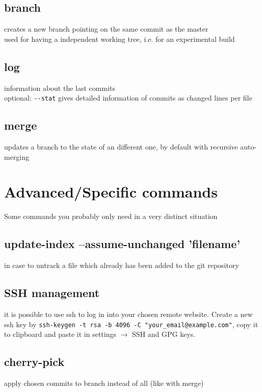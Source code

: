 \subsection*{branch}
creates a new branch pointing on the same commit as the master\\
used for having a independent working tree, i.e. for an experimental build\\

\subsection*{log}
information about the last commits \\
optional: \texttt{-{}-stat} gives detailed information of commits as changed lines per file \\

\subsection*{merge}
updates a branch to the state of an different one, by default with recursive auto-merging\\


\section*{Advanced/Specific commands}
Some commands you probably only need in a very distinct situation\\
\subsection*{update-index –assume-unchanged 'filename'}
in case to untrack a file which already has been added to the git repository\\

\subsection*{SSH management}
it is possible to use ssh to log in into your chosen remote website. Create a new ssh key by \texttt{ssh-keygen -t rsa -b 4096 -C "your\_email@example.com"}, copy it to clipboard and paste it in settings $\rightarrow$ SSH and GPG keys.\\

\subsection*{cherry-pick}
apply chosen commits to branch instead of all (like with merge)\\

